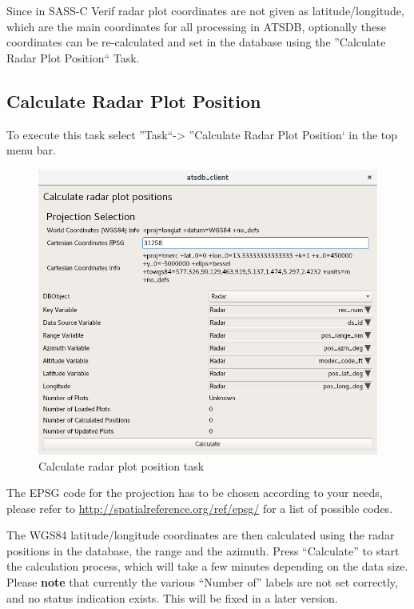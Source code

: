 \documentclass[10pt,letterpaper,extrafontsizes]{memoir}
\begin{document}
Since in SASS-C Verif radar plot coordinates are not given as latitude/longitude, which are the main coordinates for all processing in ATSDB, optionally these coordinates can be re-calculated and set in the database using the ''Calculate Radar Plot Position`` Task.

\subsection{Calculate Radar Plot Position}
To execute this task select ''Task``->  ''Calculate Radar Plot Position` in the top menu bar.

\begin{figure}[H]
  \center
    \includegraphics[width=14cm]{../screenshots/task_calc_radar.png}
  \caption{Calculate radar plot position task}
  \label{fig:task_calc_radar}
\end{figure}

The EPSG code for the projection has to be chosen according to your needs, please refer to \url{http://spatialreference.org/ref/epsg/} for a list of possible codes.

The WGS84 latitude/longitude coordinates are then calculated using the radar positions in the database, the range and the azimuth. Press ``Calculate'' to start the calculation process, which will take a few minutes depending on the data size. \\

Please \textbf{note} that currently the various ``Number of'' labels are not set correctly, and no status indication exists. This will be fixed in a later version. \\
\end{document}
